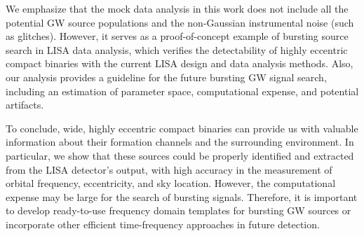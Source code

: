 \documentclass[%
 reprint,
 amsmath,amssymb,
 aps,
]{revtex4-2}
\begin{document}
We emphasize that the mock data analysis in this work does not include all the potential GW source populations and the non-Gaussian instrumental noise (such as glitches). However, it serves as a proof-of-concept example of bursting source search in LISA data analysis, which verifies the detectability of highly eccentric compact binaries with the current LISA design and data analysis methods. Also, our analysis provides a guideline for the future bursting GW signal search, including an estimation of parameter space, computational expense, and potential artifacts.  

To conclude, wide, highly eccentric compact binaries can provide us with valuable information about their formation channels and the surrounding environment. In particular, we show that these sources could be properly identified and extracted from the LISA detector's output, with high accuracy in the measurement of orbital frequency, eccentricity, and sky location. However, the computational expense may be large for the search of bursting signals. Therefore, it is important to develop ready-to-use frequency domain templates for bursting GW sources or incorporate other efficient time-frequency approaches in future detection.


\end{document}
